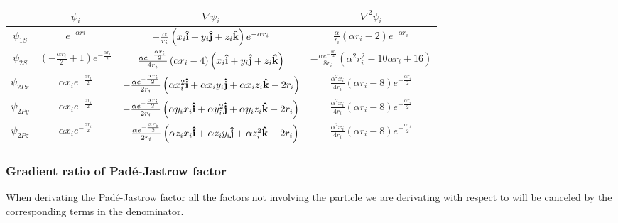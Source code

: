 \documentclass[11pt]{article}
\begin{document}
			\begin{center}
				\begin{tabular}{| c | c | c | c |}
				\bottomrule
				& \( \psi_i\)	& \( \nabla\psi_i \) & \( \nabla^2\psi_i \)
				\\ \hline
					\(\psi_{1S}\)
					&
					\( e^{- \alpha ri} \)
					&
					\( - \frac{\alpha}{r_{i}} \left(x_{i}\vu{i} + y_{i}\vu{j} + z_{i}\vu{k}\right) e^{- \alpha r_{i}} \)
					&
					\(\frac{\alpha}{r_{i}} \left(\alpha r_{i} - 2\right) e^{- \alpha r_{i}} \)
				\\	\hline
					\(\psi_{2S}\)
					&
					\( \left(- \frac{\alpha r_{i}}{2} + 1\right) e^{- \frac{\alpha r_{i}}{2}} \)
					&
					\( \frac{\alpha e^{- \frac{\alpha r_{i}}{2}}}{4 r_{i}} \left(\alpha r_{i} - 4\right) \left(x_{i}\vu{i} + y_{i}\vu{j} + z_{i}\vu{k}\right) \)
					&
					\( - \frac{\alpha e^{- \frac{\alpha r_{i}}{2}}}{8 r_{i}} \left(\alpha^{2} r_{i}^{2} - 10 \alpha r_{i} + 16\right) \)
				\\	\hline
					\(\psi_{2Px}\)
					&
					\( \alpha x_{i} e^{- \frac{\alpha r_{i}}{2}} \)
					&
					\( - \frac{\alpha e^{- \frac{\alpha r_{i}}{2}}}{2 r_{i}} \left(\alpha x_{i}^{2}\vu{i} + \alpha x_{i} y_{i}\vu{j} + \alpha x_{i} z_{i}\vu{k} - 2 r_{i}\right) \)
					&
					\( \frac{\alpha^{2} x_{i}}{4 r_{i}} \left(\alpha r_{i} - 8\right) e^{- \frac{\alpha r_{i}}{2}} \)
				\\	\hline
					\(\psi_{2Py}\)
					&
					\( \alpha x_{i} e^{- \frac{\alpha r_{i}}{2}} \)
					&
					\( - \frac{\alpha e^{- \frac{\alpha r_{i}}{2}}}{2 r_{i}} \left(\alpha y_{i} x_{i}\vu{i} + \alpha y_{i}^{2}\vu{j} + \alpha y_{i} z_{i}\vu{k} - 2 r_{i}\right) \)
					&
					\( \frac{\alpha^{2} x_{i}}{4 r_{i}} \left(\alpha r_{i} - 8\right) e^{- \frac{\alpha r_{i}}{2}} \)
				\\	\hline
					\(\psi_{2Pz}\)
					&
					\( \alpha x_{i} e^{- \frac{\alpha r_{i}}{2}} \)
					&
					\( - \frac{\alpha e^{- \frac{\alpha r_{i}}{2}}}{2 r_{i}} \left(\alpha z_{i} x_{i}\vu{i} + \alpha z_{i} y_{i}\vu{j} + \alpha z_{i}^{2}\vu{k} - 2 r_{i}\right) \)
					&
					\( \frac{\alpha^{2} x_{i}}{4 r_{i}} \left(\alpha r_{i} - 8\right) e^{- \frac{\alpha r_{i}}{2}} \)
				\\ \toprule
				\end{tabular}
			\end{center}

		\subsubsection{Gradient ratio of  Padé-Jastrow factor }
			When derivating the Padé-Jastrow factor all the factors not involving the particle we are derivating with respect to will be canceled by the corresponding terms in the denominator.
\end{document}
